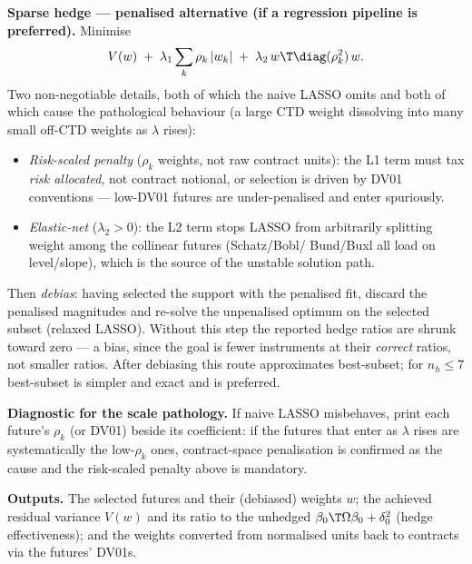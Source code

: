\smallskip\noindent\textbf{Sparse hedge --- penalised alternative (if a
regression pipeline is preferred).} Minimise
\[
  V(w)\;+\;\lambda_1\sum_k \rho_k\,|w_k|\;+\;\lambda_2\,w\T\diag(\rho_k^2)\,w .
\]
Two non-negotiable details, both of which the naive LASSO omits and both of
which cause the pathological behaviour (a large CTD weight dissolving into many
small off-CTD weights as $\lambda$ rises):
\begin{itemize}
  \item \emph{Risk-scaled penalty} ($\rho_k$ weights, not raw contract units):
        the L1 term must tax \emph{risk allocated}, not contract notional, or
        selection is driven by DV01 conventions --- low-DV01 futures are
        under-penalised and enter spuriously.
  \item \emph{Elastic-net} ($\lambda_2>0$): the L2 term stops LASSO from
        arbitrarily splitting weight among the collinear futures (Schatz/Bobl/
        Bund/Buxl all load on level/slope), which is the source of the unstable
        solution path.
\end{itemize}
Then \emph{debias}: having selected the support with the penalised fit, discard
the penalised magnitudes and re-solve the unpenalised optimum on the selected
subset (relaxed LASSO). Without this step the reported hedge ratios are
shrunk toward zero --- a bias, since the goal is fewer instruments at their
\emph{correct} ratios, not smaller ratios. After debiasing this route
approximates best-subset; for $n_h\le7$ best-subset is simpler and exact and is
preferred.
 
\smallskip\noindent\textbf{Diagnostic for the scale pathology.} If naive LASSO
misbehaves, print each future's $\rho_k$ (or DV01) beside its coefficient: if
the futures that enter as $\lambda$ rises are systematically the low-$\rho_k$
ones, contract-space penalisation is confirmed as the cause and the risk-scaled
penalty above is mandatory.
 
\smallskip\noindent\textbf{Outputs.} The selected futures and their (debiased)
weights $w$; the achieved residual variance $V(w)$ and its ratio to the
unhedged $\beta_0\T\Omega\beta_0+\delta_0^2$ (hedge effectiveness); and the
weights converted from normalised units back to contracts via the futures'
DV01s.
 
